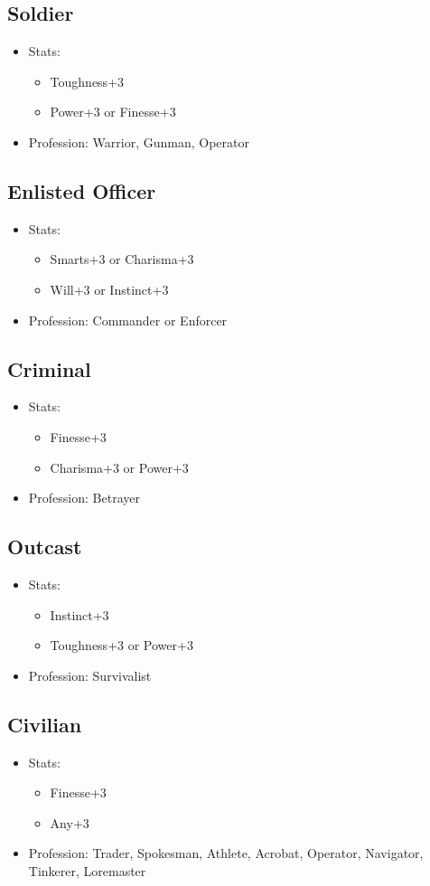\subsection{Soldier}
\begin{itemize}
	\item Stats:
	\begin{itemize}
		\item Toughness+3
		\item Power+3 or Finesse+3
	\end{itemize}
	\item Profession: Warrior, Gunman, Operator
\end{itemize}

\subsection{Enlisted Officer}
\begin{itemize}
	\item Stats:
	\begin{itemize}
		\item Smarts+3 or Charisma+3
		\item Will+3 or Instinct+3
	\end{itemize}
	\item Profession: Commander or Enforcer
\end{itemize}

\subsection{Criminal}
\begin{itemize}
	\item Stats:
	\begin{itemize}
		\item Finesse+3
		\item Charisma+3 or Power+3
	\end{itemize}
	\item Profession: Betrayer
\end{itemize}

\subsection{Outcast}
\begin{itemize}
	\item Stats:
	\begin{itemize}
		\item Instinct+3
		\item Toughness+3 or Power+3
	\end{itemize}
	\item Profession: Survivalist
\end{itemize}

\subsection{Civilian}
\begin{itemize}
	\item Stats:
	\begin{itemize}
		\item Finesse+3
		\item Any+3
	\end{itemize}
	\item Profession: Trader, Spokesman, Athlete, Acrobat, Operator, Navigator, Tinkerer, Loremaster
\end{itemize}
